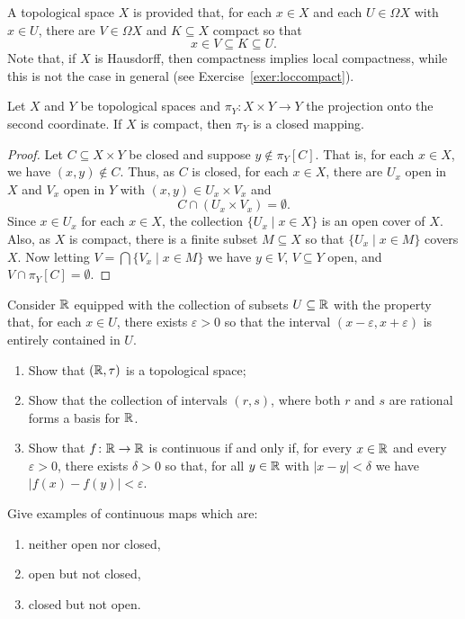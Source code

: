 A topological space $X$ is  provided that, for each $x\in X$ and each $U\in\Omega X$ with $x\in U$, there are $V\in\Omega X$ and $K\subseteq X$ compact so that
\[
x\in V\subseteq K\subseteq U.
\]
Note that, if $X$ is Hausdorff, then compactness implies local compactness, while this is not the case in general (see Exercise~\ref{exer:loccompact}).

\begin{proposition}\label{prop:proj-along-comp}
Let $X$ and $Y$ be topological spaces and $\pi_Y\colon X\times Y \to Y$ the projection onto the second coordinate. If $X$ is compact, then $\pi_Y$ is a closed mapping.
\end{proposition}

\begin{proof}
Let $C\subseteq X\times Y$ be closed and suppose $y\not\in\pi_Y[C]$. That is, for each $x\in X$, we have $(x,y)\not\in C$. Thus, as $C$ is closed,  for each $x\in X$, there are $U_x$ open in $X$ and $V_x$ open in $Y$ with $(x,y)\in U_x\times V_x$ and
\[
C\cap (U_x\times V_x)=\emptyset.
\]
Since $x\in U_x$ for each $x\in X$, the collection $\{U_x\mid x\in X\}$ is an open cover of $X$. Also, as $X$ is compact, there is a finite subset $M\subseteq X$ so that $\{U_x\mid x\in M\}$ covers $X$. Now
letting $V=\bigcap\{V_x\mid x\in M\}$ we have $y\in V$, $V\subseteq Y$ open, and $V\cap\pi_Y[C]=\emptyset$.
\end{proof}

\exercises
\begin{exercise}\label{exer:real}
Consider $\mathbb{R}$ equipped with the collection of subsets $U\subseteq\mathbb{R}$ with the property that, for each $x\in U$, there exists $\varepsilon>0$ so that the interval $(x-\varepsilon,x+\varepsilon)$ is entirely contained in $U$.
\begin{enumerate}
\item Show that $(\mathbb{R},\tau)$ is a topological space;
\item Show that the collection of intervals $(r,s)$, where both $r$ and $s$ are rational forms a basis for $\mathbb{R}$.
\item Show that $f\colon\mathbb{R}\to\mathbb{R}$ is continuous if and only if, for every $x\in\mathbb{R}$ and every $\varepsilon>0$, there exists $\delta>0$ so that, for all $y\in\mathbb{R}$ with $|x-y|<\delta$ we have $|f(x)-f(y)|<\varepsilon$.
\end{enumerate}
\end{exercise}

\begin{exercise}\label{exer:open-closed-map}
Give examples of continuous maps which are:
\begin{enumerate}
\item neither open nor closed,
\item open but not closed,
\item closed but not open.
\end{enumerate}
\end{exercise}

